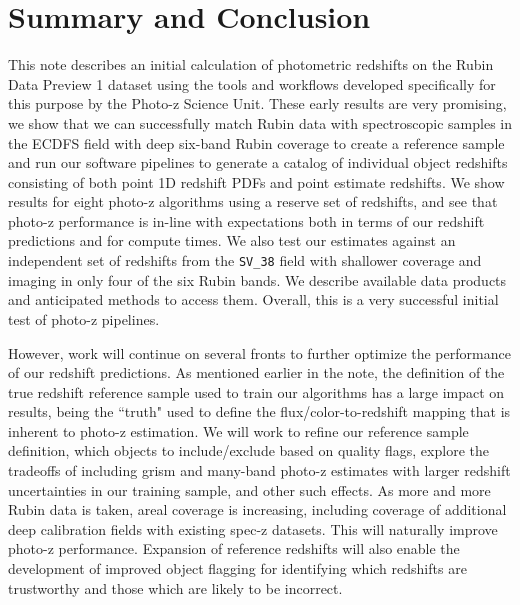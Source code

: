 \section{Summary and Conclusion}
\label{sec:summary:0}

This note describes an initial calculation of photometric redshifts on the Rubin Data Preview 1 dataset using the tools and workflows developed specifically for this purpose by the Photo-z Science Unit.  These early results are very promising, we show that we can successfully match Rubin data with spectroscopic samples in the ECDFS field with deep six-band Rubin coverage to create a reference sample and run our software pipelines to generate a catalog of individual object redshifts consisting of both point 1D redshift PDFs and point estimate redshifts.  We show results for eight photo-z algorithms using a reserve set of redshifts, and see that photo-z performance is in-line with expectations both in terms of our redshift predictions and for compute times.  We also test our estimates against an independent set of redshifts from the \texttt{SV\_38} field with shallower coverage and imaging in only four of the six Rubin bands.  We describe available data products and anticipated methods to access them.  Overall, this is a very successful initial test of photo-z pipelines.

However, work will continue on several fronts to further optimize the performance of our redshift predictions.  As mentioned earlier in the note, the definition of the true redshift reference sample used to train our algorithms has a large impact on results, being the ``truth" used to define the flux/color-to-redshift mapping that is inherent to photo-z estimation.  We will work to refine our reference sample definition, which objects to include/exclude based on quality flags, explore the tradeoffs of including grism and many-band photo-z estimates with larger redshift uncertainties in our training sample, and other such effects.  As more and more Rubin data is taken, areal coverage is increasing, including coverage of additional deep calibration fields with existing spec-z datasets.  This will naturally improve photo-z performance.  Expansion of reference redshifts will also enable the development of improved object flagging for identifying which redshifts are trustworthy and those which are likely to be incorrect.


